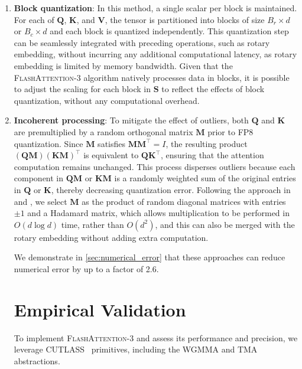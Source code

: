 \begin{enumerate}

\item \textbf{Block quantization}: In this method, a single scalar per block is maintained. For each of $\mathbf{Q}$, $\mathbf{K}$, and $\mathbf{V}$, the tensor is partitioned into blocks of size $B_r \times d$ or $B_c \times d$ and each block is quantized independently. This quantization step can be seamlessly integrated with preceding operations, such as rotary embedding, without incurring any additional computational latency, as rotary embedding is limited by memory bandwidth. Given that the \textsc{FlashAttention-3} algorithm natively processes data in blocks, it is possible to adjust the scaling for each block in $\mathbf{S}$ to reflect the effects of block quantization, without any computational overhead.

\item \textbf{Incoherent processing}: To mitigate the effect of outliers, both $\mathbf{Q}$ and $\mathbf{K}$ are premultiplied by a random orthogonal matrix $\mathbf{M}$ prior to FP8 quantization. Since $\mathbf{M}$ satisfies $\mathbf{M} \mathbf{M}^\top = I$, the resulting product $(\mathbf{Q} \mathbf{M}) (\mathbf{K} \mathbf{M})^\top$ is equivalent to $\mathbf{Q} \mathbf{K}^\top$, ensuring that the attention computation remains unchanged. This process disperses outliers because each component in $\mathbf{Q} \mathbf{M}$ or $\mathbf{K} \mathbf{M}$ is a randomly weighted sum of the original entries in $\mathbf{Q}$ or $\mathbf{K}$, thereby decreasing quantization error. Following the approach in \citet{chee2024quip} and \citet{tseng2024quip}, we select $\mathbf{M}$ as the product of random diagonal matrices with entries $\pm 1$ and a Hadamard matrix, which allows multiplication to be performed in $O(d \log d)$ time, rather than $O(d^2)$, and this can also be merged with the rotary embedding without adding extra computation.

We demonstrate in \cref{sec:numerical_error} that these approaches can reduce numerical error by up to a factor of 2.6.

\section{Empirical Validation}
\label{sec:exp}

To implement \textsc{FlashAttention-3} and assess its performance and precision, we leverage CUTLASS~\citep{Thakkar_CUTLASS_2023} primitives, including the WGMMA and TMA abstractions.


\end{enumerate}
